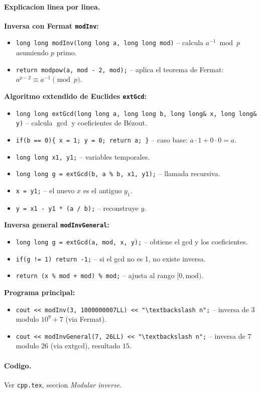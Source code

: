 \paragraph{Explicacion linea por linea.}
\textbf{Inversa con Fermat \texttt{modInv}:}
\begin{itemize}\setlength\itemsep{0pt}
	\item \verb|long long modInv(long long a, long long mod)| -- calcula $a^{-1} \bmod p$ asumiendo $p$ primo.
	\item \verb|return modpow(a, mod - 2, mod);| -- aplica el teorema de Fermat: $a^{p-2} \equiv a^{-1} \pmod p$.
\end{itemize}
\textbf{Algoritmo extendido de Euclides \texttt{extGcd}:}
\begin{itemize}\setlength\itemsep{0pt}
	\item \verb|long long extGcd(long long a, long long b, long long& x, long long& y)| -- calcula $\gcd$ y coeficientes de B\'ezout.
	\item \verb|if(b == 0){ x = 1; y = 0; return a; }| -- caso base: $a \cdot 1 + 0 \cdot 0 = a$.
	\item \verb|long long x1, y1;| -- variables temporales.
	\item \verb|long long g = extGcd(b, a % b, x1, y1);| -- llamada recursiva.
	\item \verb|x = y1;| -- el nuevo $x$ es el antiguo $y_1$.
	\item \verb|y = x1 - y1 * (a / b);| -- reconstruye $y$.
\end{itemize}
\textbf{Inversa general \texttt{modInvGeneral}:}
\begin{itemize}\setlength\itemsep{0pt}
	\item \verb|long long g = extGcd(a, mod, x, y);| -- obtiene el gcd y los coeficientes.
	\item \verb|if(g != 1) return -1;| -- si el gcd no es 1, no existe inversa.
	\item \verb|return (x % mod + mod) % mod;| -- ajusta al rango $[0, \text{mod})$.
\end{itemize}
\textbf{Programa principal:}
\begin{itemize}\setlength\itemsep{0pt}
	\item \verb|cout << modInv(3, 1000000007LL) << "\textbackslash n";| -- inversa de $3$ modulo $10^9+7$ (via Fermat).
	\item \verb|cout << modInvGeneral(7, 26LL) << "\textbackslash n";| -- inversa de $7$ modulo $26$ (via extgcd), resultado $15$.
\end{itemize}

\paragraph{Codigo.}
Ver \texttt{cpp.tex}, seccion \textit{Modular inverse}.

\vspace{0.5em|||}
